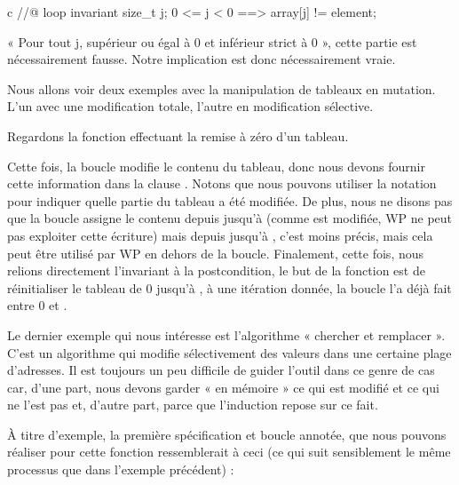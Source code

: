\begin{CodeBlock}{c}
//@ loop invariant \forall size_t j; 0 <= j < 0 ==> array[j] != element;
\end{CodeBlock}


« Pour tout j, supérieur ou égal à 0 et inférieur strict à 0 », cette partie est
nécessairement fausse. Notre implication est donc nécessairement vraie.




Nous allons voir deux exemples avec la manipulation de tableaux en mutation.
L'un avec une modification totale, l'autre en modification sélective.





Regardons la fonction effectuant la remise à zéro d'un tableau.





Cette fois, la boucle modifie le contenu du tableau, donc nous devons fournir
cette information dans la clause . Notons que nous
pouvons utiliser la notation  pour indiquer quelle partie du
tableau a été modifiée. De plus, nous ne disons pas que la boucle assigne le
contenu depuis  jusqu'à  (comme 
est modifiée, WP ne peut pas exploiter cette écriture) mais depuis 
jusqu'à , c'est moins précis, mais cela peut être utilisé
par WP en dehors de la boucle. Finalement, cette fois, nous relions directement
l'invariant à la postcondition, le but de la fonction est de réinitialiser le
tableau de 0 jusqu'à , à une itération donnée, la boucle l'a
déjà fait entre 0 et .


\label{l4:statements-loops-ex-search-and-replace}


Le dernier exemple qui nous intéresse est l'algorithme « chercher et remplacer ».
C'est un algorithme qui modifie sélectivement des valeurs dans une
certaine plage d'adresses. Il est toujours un peu difficile de guider l'outil
dans ce genre de cas car, d'une part, nous devons garder « en mémoire » ce qui est modifié
et ce qui ne l'est pas et, d'autre part, parce que l'induction repose sur ce fait.


À titre d'exemple, la première spécification et boucle annotée, que nous pouvons
réaliser pour cette fonction ressemblerait à ceci (ce qui suit sensiblement le
même processus que dans l'exemple précédent) :


